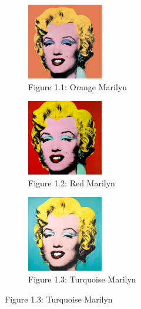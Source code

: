 \documentclass{article}
\begin{document}
\begin{figure}[ht]
  \centering
  \begin{subfigure}{0.3\textwidth}
    \centering
    \includegraphics[width=125px]{main_files/figure-latex/1_1_orange_marilyn.jpg}
    \caption{Figure 1.1: Orange Marilyn}
    \label{fig:1_1_orange_marilyn}
  \end{subfigure}
  \hfill
  \begin{subfigure}{0.3\textwidth}
    \centering
    \includegraphics[width=125px]{main_files/figure-latex/1_2_red_marilyn.jpg}
    \caption{Figure 1.2: Red Marilyn}
    \label{fig:1_2_red_marilyn}
  \end{subfigure}
  \hfill
  \begin{subfigure}{0.3\textwidth}
    \centering
    \includegraphics[width=125px]{main_files/figure-latex/1_3_turq_marilyn.jpg}
    \caption{Figure 1.3: Turquoise Marilyn}
    \label{fig:1_3_turq_marilyn}
  \end{subfigure}

  \vspace{1em} %


\end{figure}
\end{document}
